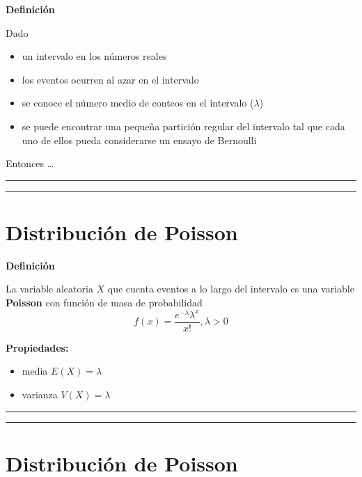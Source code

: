 \documentclass[
]{book}
\providecommand{\tightlist}{%
  \setlength{\itemsep}{0pt}\setlength{\parskip}{0pt}}
\begin{document}
\textbf{Definición}

Dado

\begin{itemize}
\tightlist
\item
  un intervalo en los números reales
\item
  los eventos ocurren al azar en el intervalo
\item
  se conoce el número medio de conteos en el intervalo (\(\lambda\))
\item
  se puede encontrar una pequeña partición regular del intervalo tal que cada uno de ellos pueda considerarse un ensayo de Bernoulli
\end{itemize}

Entonces \ldots{}

\begin{center}\rule{0.5\linewidth}{0.5pt}\end{center}

\begin{center}\rule{0.5\linewidth}{0.5pt}\end{center}

\hypertarget{distribuciuxf3n-de-poisson-3}{%
\section{Distribución de Poisson}\label{distribuciuxf3n-de-poisson-3}}

\textbf{Definición}

La variable aleatoria \(X\) que cuenta eventos a lo largo del intervalo es una variable \textbf{Poisson} con función de masa de probabilidad
\[f(x)= \frac{e^{-\lambda}\lambda^x}{x!}, \lambda>0\]

\textbf{Propiedades:}

\begin{itemize}
\tightlist
\item
  media \(E(X)= \lambda\)
\item
  varianza \(V(X)= \lambda\)
\end{itemize}

\begin{center}\rule{0.5\linewidth}{0.5pt}\end{center}

\begin{center}\rule{0.5\linewidth}{0.5pt}\end{center}

\hypertarget{distribuciuxf3n-de-poisson-4}{%
\section{Distribución de Poisson}\label{distribuciuxf3n-de-poisson-4}}
\end{document}
